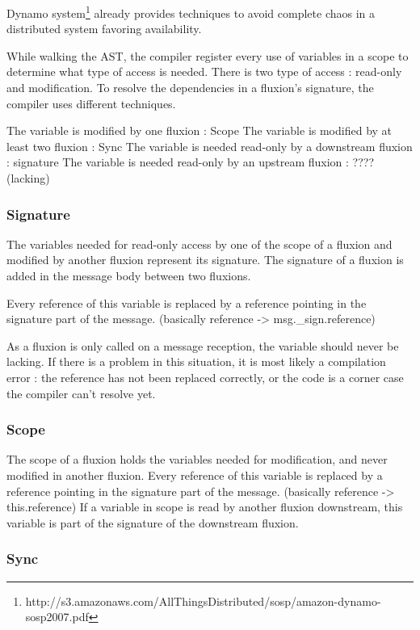 Dynamo system\footnote{http://s3.amazonaws.com/AllThingsDistributed/sosp/amazon-dynamo-sosp2007.pdf} already provides techniques to avoid complete chaos in a distributed system favoring availability.





While walking the AST, the compiler register every use of variables in a scope to determine what type of access is needed.
There is two type of access : read-only and modification.
To resolve the dependencies in a fluxion's signature, the compiler uses different techniques.

The variable is modified by one fluxion : Scope
The variable is modified by at least two fluxion : Sync
The variable is needed read-only by a downstream fluxion : signature
The variable is needed read-only by an upstream fluxion : ???? (lacking)


\subsubsection{Signature}

  The variables needed for read-only access by one of the scope of a fluxion and modified by another fluxion represent its signature.
  The signature of a fluxion is added in the message body between two fluxions.

  Every reference of this variable is replaced by a reference pointing in the signature part of the message.
  (basically reference -> msg.\_sign.reference)

  As a fluxion is only called on a message reception, the variable should never be lacking.
  If there is a problem in this situation, it is most likely a compilation error : the reference has not been replaced correctly, or the code is a corner case the compiler can't resolve yet.

\subsubsection{Scope}

  The scope of a fluxion holds the variables needed for modification, and never modified in another fluxion.
  Every reference of this variable is replaced by a reference pointing in the signature part of the message.
  (basically reference -> this.reference)
  If a variable in scope is read by another fluxion downstream, this variable is part of the signature of the downstream fluxion.

\subsubsection{Sync}


